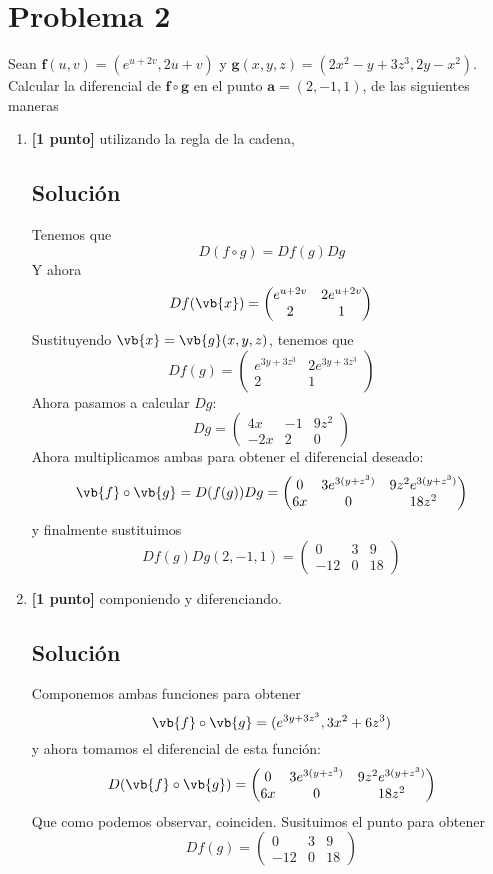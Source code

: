 \documentclass[12pt,a4paper,reqno]{article}
\begin{document}
	\section{Problema 2}
	Sean $\bm f(u,v)=\left(e^{u+2v},2u+v\right)$ y $\bm g(x,y,z)=\left(2x^2-y+3z^3,2y-x^2\right)$. Calcular la diferencial de $\bm f\circ\bm g$ en el punto $\bm a=(2,-1,1)$, de las siguientes maneras
	\begin{enumerate}[label={(\alph*)}]
		\item \textbf{[1 punto]} utilizando la regla de la cadena,
		
		\subsection*{Solución}
		Tenemos que
		\[
			D(f \circ g)=D f(g)Dg
		\]
		Y ahora
		\[
			D f(\vb{x})= \begin{pmatrix} 
				e^{u+2v} & 2e^{u+2v} \\2 & 1
			\end{pmatrix} 
		\]
		Sustituyendo $\vb{x}=\vb{g}(x,y,z)$, tenemos que
		\[
			D f(g)= \begin{pmatrix} 
				e^{3y+3z ^{3}} & 2 e^{3y +3z ^{3}} \\ 2 & 1
			\end{pmatrix} 
		\]
		Ahora pasamos a calcular $Dg$:
		\[
			Dg = \begin{pmatrix} 
				4x & -1 & 9z ^{2} \\ -2x & 2 & 0
			\end{pmatrix} 
		\]
		Ahora multiplicamos ambas para obtener el diferencial deseado:
		\[
			\vb{f} \circ \vb{g} = D(f(g))Dg = \begin{pmatrix} 
				0 & 3e^{3(y+z ^{3})} & 9z ^{2}e^{3(y+z^{3})}\\
				6x & 0 & 18z ^{2}
			\end{pmatrix} 
		\]
		y finalmente sustituimos
		\[
			Df(g)Dg(2,-1,1)= \begin{pmatrix} 0 &3&9\\ -12 & 0 & 18 \end{pmatrix} 
		\]
		\item \textbf{[1 punto]} componiendo y diferenciando.
		
		\subsection*{Solución}
		Componemos ambas funciones para obtener
		\[
			\vb{f}\circ \vb{g} = (e^{3y+3z^{3}},3x ^{2}+6z ^{3})
		\]
		y ahora tomamos el diferencial de esta función:
		\[
			D(\vb{f}\circ\vb{g}) = \begin{pmatrix} 
				0 & 3e^{3(y+z^{3})} & 9z^{2}e^{3(y+z^{3})}\\
				6x & 0 & 18z^{2}
			\end{pmatrix} 
		\]
		Que como podemos observar, coinciden. Susituimos el punto para obtener
		\[
			Df(g)= \begin{pmatrix} 0 & 3 & 9 \\ -12 & 0 & 18 \end{pmatrix} 
		\]
	\end{enumerate}
	
\end{document}
